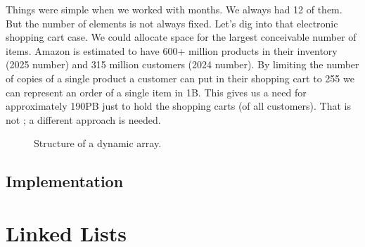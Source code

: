 Things were simple when we worked with months. We always had 12 of them. But the number of elements is not always fixed. Let's dig into that electronic shopping cart case. We could allocate space for the largest conceivable number of items. Amazon is estimated to have 600+ million products in their inventory (2025 number) and 315 million customers (2024 number). By limiting the number of copies of a single product a customer can put in their shopping cart to 255 we can represent an order of a single item in 1B. This gives us a need for approximately 190PB just to hold the shopping carts (of all customers). That is not ; a different approach is needed.




\begin{figure}[tbp]
  
  \caption{Structure of a dynamic array.}
  \label{fig:collections:dynarray}
\end{figure}


\subsection{Implementation}

\subsection{\csharp}

\section{Linked Lists}
\label{collections:linkedlist}

